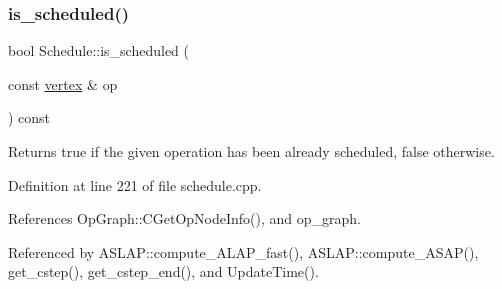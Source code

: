 \subsubsection{\texorpdfstring{is\+\_\+scheduled()}{is\_scheduled()}\hspace{0.1cm}{\footnotesize\ttfamily [1/2]}}
{\footnotesize\ttfamily bool Schedule\+::is\+\_\+scheduled (\begin{DoxyParamCaption}\item[{const \hyperlink{graph_8hpp_abefdcf0544e601805af44eca032cca14}{vertex} \&}]{op }\end{DoxyParamCaption}) const}



Returns true if the given operation has been already scheduled, false otherwise. 



Definition at line 221 of file schedule.\+cpp.



References Op\+Graph\+::\+C\+Get\+Op\+Node\+Info(), and op\+\_\+graph.



Referenced by A\+S\+L\+A\+P\+::compute\+\_\+\+A\+L\+A\+P\+\_\+fast(), A\+S\+L\+A\+P\+::compute\+\_\+\+A\+S\+A\+P(), get\+\_\+cstep(), get\+\_\+cstep\+\_\+end(), and Update\+Time().

